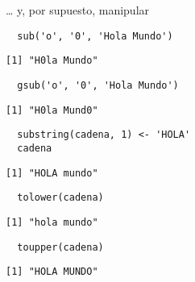 \documentclass[xcolor={usenames,svgnames,dvipsnames}]{beamer}
\begin{document}
\begin{frame}[fragile,label=sec-3-6]{\ldots{} y, por supuesto, manipular}
 \lstset{language=R,label= ,caption= ,numbers=none}
\begin{lstlisting}
  sub('o', '0', 'Hola Mundo')
\end{lstlisting}

\begin{verbatim}
[1] "H0la Mundo"
\end{verbatim}

\lstset{language=R,label= ,caption= ,numbers=none}
\begin{lstlisting}
  gsub('o', '0', 'Hola Mundo')
\end{lstlisting}

\begin{verbatim}
[1] "H0la Mund0"
\end{verbatim}

\lstset{language=R,label= ,caption= ,numbers=none}
\begin{lstlisting}
  substring(cadena, 1) <- 'HOLA'
  cadena
\end{lstlisting}

\begin{verbatim}
[1] "HOLA mundo"
\end{verbatim}

\lstset{language=R,label= ,caption= ,numbers=none}
\begin{lstlisting}
  tolower(cadena)
\end{lstlisting}

\begin{verbatim}
[1] "hola mundo"
\end{verbatim}

\lstset{language=R,label= ,caption= ,numbers=none}
\begin{lstlisting}
  toupper(cadena)
\end{lstlisting}

\begin{verbatim}
[1] "HOLA MUNDO"
\end{verbatim}
\end{frame}
\end{document}
